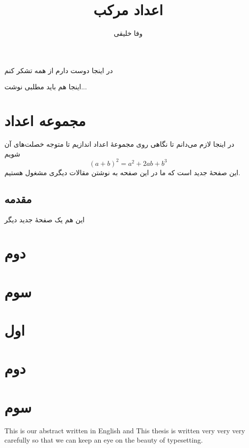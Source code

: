 \documentclass[a4paper,11pt]{xepersian-thesis}
\begin{document}
\title{اعداد مرکب}
\author{وفا خلیقی}
\thesisdate{\today}
\maketitle
\begin{acknowledgementpage}
در اینجا دوست دارم از همه تشکر کنم
\end{acknowledgementpage}
\begin{abstractpage}
اینجا هم باید مطلبی نوشت...
\end{abstractpage}
\tableofcontents
\listoftables
\chapter{مجموعه اعداد}
در اینجا لازم می‌دانم تا نگاهی روی مجموعهٔ اعداد اندازیم تا متوجه خصلت‌های آن شویم
\begin{equation}
(a+b)^2=a^2+2ab+b^3
\end{equation}
\newpage
این صفحهٔ جدید است که ما در این صفحه به نوشتن مقالات دیگری مشغول هستیم.
\section{مقدمه}

\newpage
این هم یک صفحهٔ جدید دیگر
\chapter{دوم}
\chapter{سوم}
\appendix
\chapter{اول}
\chapter{دوم}
\chapter{سوم}

\begin{thebibliography}{99}
\end{thebibliography}
\begin{english}
\englishthesisdate{\englishtoday}
\begin{englishabstract}
\noindent This is our abstract written in English and This thesis is written very very very carefully so that we can keep  an eye on the beauty of typesetting.
\end{englishabstract}
\makeenglishtitle
\end{english}
\end{document}
